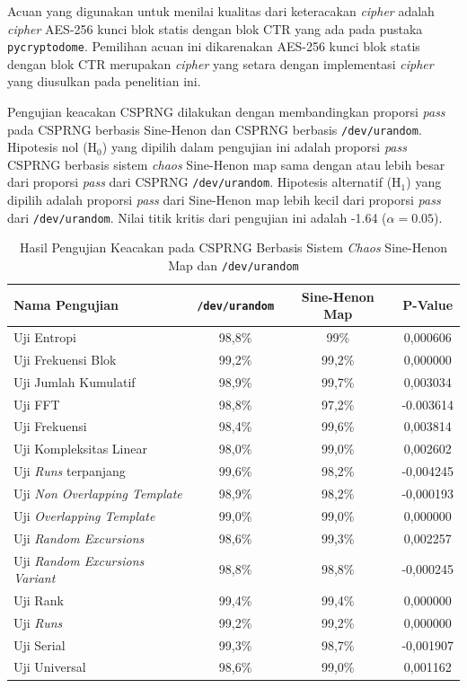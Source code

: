 Acuan yang digunakan untuk menilai kualitas dari keteracakan \emph{cipher} adalah \emph{cipher} AES-256 kunci blok statis dengan blok CTR yang ada pada pustaka \texttt{pycryptodome}. Pemilihan acuan ini dikarenakan AES-256 kunci blok statis dengan blok CTR merupakan \emph{cipher} yang setara dengan implementasi \emph{cipher} yang diusulkan pada penelitian ini.

Pengujian keacakan CSPRNG dilakukan dengan membandingkan proporsi \emph{pass} pada CSPRNG berbasis Sine-Henon dan CSPRNG berbasis \texttt{/dev/urandom}. Hipotesis nol ($\text{H}_0$) yang dipilih dalam pengujian ini adalah proporsi \emph{pass} CSPRNG berbasis sistem \emph{chaos} Sine-Henon map sama dengan atau lebih besar dari proporsi \emph{pass} dari CSPRNG \texttt{/dev/urandom}. Hipotesis alternatif ($\text{H}_1$) yang dipilih adalah proporsi \emph{pass} dari Sine-Henon map lebih kecil dari proporsi \emph{pass} dari \texttt{/dev/urandom}. Nilai titik kritis dari pengujian ini adalah -1.64 ($\alpha = 0.05$).

\begin{table}[!h]
  \centering
  \caption{Hasil Pengujian Keacakan pada CSPRNG Berbasis Sistem \emph{Chaos} Sine-Henon Map dan \texttt{/dev/urandom}} \label{tab:test.statistic.chaos}
  \begin{tabular}{|p{3.5cm}|c|c|c|}
    \hline
    \textbf{Nama Pengujian}& \textbf{\texttt{/dev/urandom}} & \textbf{Sine-Henon Map} & \textbf{P-Value} \\ \hline
    Uji Entropi & 98,8\% & 99\% & 0,000606 \\ \hline
    Uji Frekuensi Blok & 99,2\% & 99,2\% & 0,000000 \\ \hline
    Uji Jumlah Kumulatif & 98,9\% & 99,7\% & 0,003034 \\ \hline
    Uji FFT & 98,8\% & 97,2\% & -0.003614 \\ \hline
    Uji Frekuensi & 98,4\% & 99,6\% & 0,003814 \\ \hline
    Uji Kompleksitas Linear & 98,0\% & 99,0\% & 0,002602 \\ \hline
    Uji \emph{Runs} terpanjang & 99,6\% & 98,2\% & -0,004245 \\ \hline
    Uji \emph{Non Overlapping Template} & 98,9\% & 98,2\% & -0,000193 \\ \hline
    Uji \emph{Overlapping Template} & 99,0\% & 99,0\% & 0,000000 \\ \hline
    Uji \emph{Random Excursions} & 98,6\% & 99,3\% & 0,002257 \\ \hline
    Uji \emph{Random Excursions Variant} & 98,8\% & 98,8\% & -0,000245 \\ \hline
    Uji Rank & 99,4\% & 99,4\% & 0,000000 \\ \hline
    Uji \emph{Runs} & 99,2\% & 99,2\% & 0,000000 \\ \hline
    Uji Serial & 99,3\% & 98,7\% & -0,001907 \\ \hline
    Uji Universal & 98,6\% & 99,0\% & 0,001162 \\ \hline
  \end{tabular}
\end{table}

